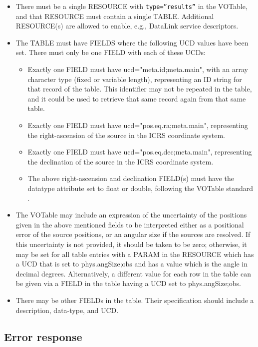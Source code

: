 \documentclass[11pt,a4paper]{ivoa}
\begin{document}
\begin{itemize}
	\item There must be a single RESOURCE with \texttt{type=''results''} in the VOTable,
		and that RESOURCE must contain a single TABLE. Additional RESOURCE(s) are
		allowed to enable, e.g., DataLink service descriptors.
	\item The TABLE must have FIELDS where
		the following UCD values have been set. There must only be one FIELD
		with each of these UCDs:

	\begin{itemize}
		\item Exactly one FIELD must have ucd="meta.id;meta.main",
	 		with an array character type (fixed or variable
			length), representing an ID string for that record of the table. This
			identifier may not be repeated in the table, and it could be used to
			retrieve that same record again from that same table.
		\item Exactly one FIELD must have ucd="pos.eq.ra;meta.main",
			representing the right-ascension of the source in the ICRS coordinate system.
		\item Exactly one FIELD must have ucd="pos.eq.dec;meta.main",
			representing the declination of the source in the ICRS coordinate system.
		\item The above right-ascension and declination FIELD(s) must have the datatype
			attribute set to float or double, following the VOTable
			standard \citep{2025ivoa.spec.0116O}.
	\end{itemize}

	\item The VOTable may include an expression of the
		uncertainty of the positions given in the above mentioned fields to be
		interpreted either as a positional error of the source positions, or an
		angular size if the sources are resolved. If this uncertainty is not
		provided, it should be taken to be zero; otherwise, it may be set for
		all table entries with a PARAM in the RESOURCE which has a UCD that is
		set to phys.angSize;obs and has a value which is the angle in decimal
		degrees. Alternatively, a different value for each row in the table can
		be given via a FIELD in the table having a UCD set to phys.angSize;obs.
	\item There may be other FIELDs in the table. Their specification should
		include a description, data-type, and UCD.
\end{itemize}
	
\subsection{Error response}
\label{subsec:error}
\end{document}
